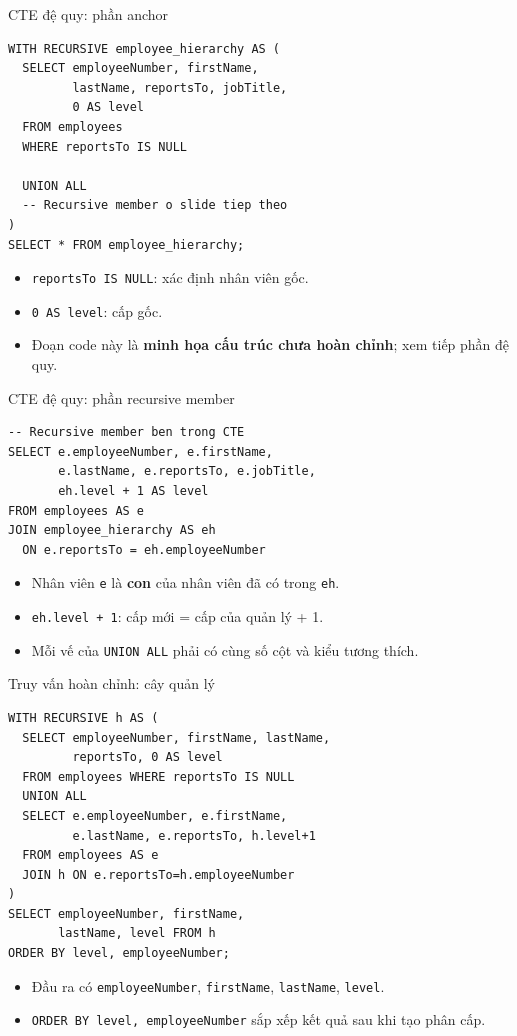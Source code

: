 \documentclass[aspectratio=169,10pt]{beamer}
\newcommand{\code}[1]{\texttt{#1}}
\begin{document}
\begin{frame}[fragile]{CTE đệ quy: phần anchor}
\small
\begin{lstlisting}[basicstyle=\ttfamily\scriptsize]
WITH RECURSIVE employee_hierarchy AS (
  SELECT employeeNumber, firstName,
         lastName, reportsTo, jobTitle,
         0 AS level
  FROM employees
  WHERE reportsTo IS NULL

  UNION ALL
  -- Recursive member o slide tiep theo
)
SELECT * FROM employee_hierarchy;
\end{lstlisting}
\vspace{.1em}
\begin{itemize}
\item \code{reportsTo IS NULL}: xác định nhân viên gốc.
\item \code{0 AS level}: cấp gốc.
\item Đoạn code này là \textbf{minh họa cấu trúc chưa hoàn chỉnh}; xem tiếp phần đệ quy.
\end{itemize}
\end{frame}

\begin{frame}[fragile]{CTE đệ quy: phần recursive member}
\small
\begin{lstlisting}[basicstyle=\ttfamily\scriptsize]
-- Recursive member ben trong CTE
SELECT e.employeeNumber, e.firstName,
       e.lastName, e.reportsTo, e.jobTitle,
       eh.level + 1 AS level
FROM employees AS e
JOIN employee_hierarchy AS eh
  ON e.reportsTo = eh.employeeNumber
\end{lstlisting}
\vspace{.1em}
\begin{itemize}
\item Nhân viên \code{e} là \textbf{con} của nhân viên đã có trong \code{eh}.
\item \code{eh.level + 1}: cấp mới = cấp của quản lý + 1.
\item Mỗi vế của \code{UNION ALL} phải có cùng số cột và kiểu tương thích.
\end{itemize}
\end{frame}

\begin{frame}[fragile]{Truy vấn hoàn chỉnh: cây quản lý}
\small
\begin{lstlisting}[basicstyle=\ttfamily\scriptsize]
WITH RECURSIVE h AS (
  SELECT employeeNumber, firstName, lastName,
         reportsTo, 0 AS level
  FROM employees WHERE reportsTo IS NULL
  UNION ALL
  SELECT e.employeeNumber, e.firstName,
         e.lastName, e.reportsTo, h.level+1
  FROM employees AS e
  JOIN h ON e.reportsTo=h.employeeNumber
)
SELECT employeeNumber, firstName,
       lastName, level FROM h
ORDER BY level, employeeNumber;
\end{lstlisting}
\vspace{.1em}
\begin{itemize}
\item Đầu ra có \code{employeeNumber}, \code{firstName}, \code{lastName}, \code{level}.
\item \code{ORDER BY level, employeeNumber} sắp xếp kết quả sau khi tạo phân cấp.
\end{itemize}
\end{frame}
\end{document}
